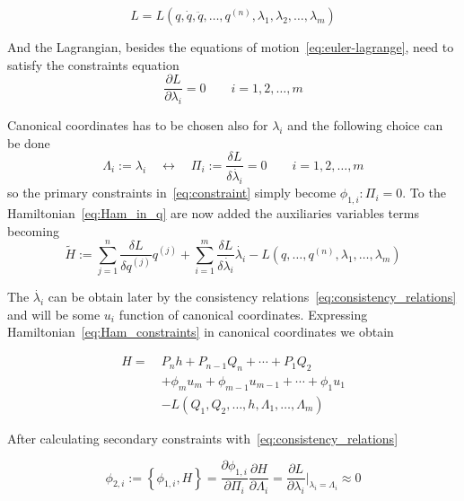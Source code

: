 \begin{equation*}
  L = L(
  q, \dot{q}, \ddot{q}, \ldots, q^{(n)},
  \lambda_1, \lambda_2, \ldots, \lambda_m
  )
\end{equation*}

And the Lagrangian, besides the equations of motion~\eqref{eq:euler-lagrange},
need to satisfy the constraints equation
\begin{equation}
  \frac{\partial L}{\partial \lambda_i} = 0 \qquad i=1, 2, \ldots, m
\end{equation}

Canonical coordinates has to be chosen also for $\lambda_i$ and the following
choice can be done
\begin{equation} \label{eq:def_canonical_coordinates_lambda}
  \Lambda_{i}:= \lambda_{i}
  \quad \leftrightarrow \quad
  \Pi_{i} := \frac{\delta L}{\delta \dot{\lambda_{i}}} = 0
  \qquad i = 1, 2, \ldots, m
\end{equation}
so the primary constraints in~\eqref{eq:constraint} simply become
$\phi_{1, i}: \Pi_i = 0$. To the Hamiltonian~\eqref{eq:Ham_in_q} are now added
the auxiliaries variables terms becoming
\begin{equation} \label{eq:Ham_constraints_in_q}
  \tilde{H} :=
  \sum_{j=1}^{n} \frac{\delta L}{\delta q^{(j)}} q^{(j)} +
  \sum_{i=1}^{m} \frac{\delta L}{\delta \dot{\lambda_i}} \dot{\lambda_i} -
  L(q, \ldots, q^{(n)}, \lambda_1, \ldots, \lambda_m)
\end{equation}

The $\dot{\lambda_i}$ can be obtain later by the consistency
relations~\eqref{eq:consistency_relations} and will be some $u_i$ function of
canonical coordinates. Expressing Hamiltonian~\eqref{eq:Ham_constraints} in
canonical coordinates we obtain

\begin{align} \label{eq:Ham_constraints}
  H =\ & P_n h + P_{n-1} Q_n + \cdots + P_1 Q_2 \nonumber \\
       & + \phi_m u_m + \phi_{m-1} u_{m-1} + \cdots + \phi_1 u_1 \nonumber \\
       & - L ( Q_1, Q_2, \ldots, h, \Lambda_1, \ldots, \Lambda_m)
\end{align}


After calculating secondary constraints with~\eqref{eq:consistency_relations}

\begin{equation*}
  \phi_{2, i} := \left\{ \phi_{1,i}, H \right\} =
  \frac{\partial \phi_{1,i}}{\partial \Pi_i}
  \frac{\partial H}{\partial \Lambda_i} =
  \frac{\partial L}{\partial \lambda_i} \Big|_{\lambda_i = \Lambda_i}
  \approx 0
\end{equation*}

